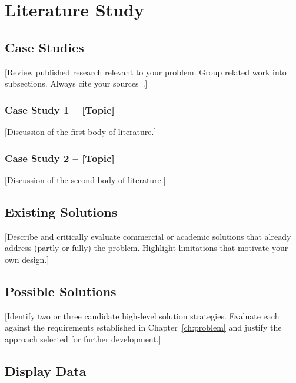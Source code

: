 \chapter{Literature Study}
\label{ch:literature}

\section{Case Studies}
\label{sec:case-studies}

[Review published research relevant to your problem. Group related
work into subsections. Always cite your sources~\cite{example_ref}.]

\subsection{Case Study 1 – [Topic]}

[Discussion of the first body of literature.]

\subsection{Case Study 2 – [Topic]}

[Discussion of the second body of literature.]

\section{Existing Solutions}
\label{sec:existing-solutions}

[Describe and critically evaluate commercial or academic solutions
that already address (partly or fully) the problem. Highlight
limitations that motivate your own design.]

\section{Possible Solutions}
\label{sec:possible-solutions}

[Identify two or three candidate high-level solution strategies.
Evaluate each against the requirements established in
Chapter~\ref{ch:problem} and justify the approach selected for
further development.]

\section{Display Data}
\label{sec:display-data}

